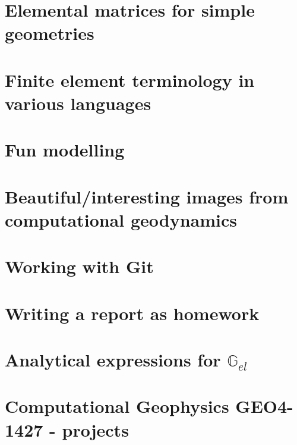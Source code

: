 \documentclass[a4paper]{article}
\numberwithin{equation}{section}
\newcommand{\G}{{\mathbb{G}}}
\begin{document}
\section{Elemental matrices for simple geometries}\label{app:mm} 
\newpage %
\section{Finite element terminology in various languages}  %
\newpage %
\section{Fun modelling}  %
\newpage %
\section{Beautiful/interesting images from computational geodynamics}%
\newpage %
\section{Working with Git} %
\newpage %
\section{Writing a report as homework \label{app:grading}} %
\newpage %
\section{Analytical expressions for $\G_{el}$} \label{app:Gel} %
\newpage %
\section{Computational Geophysics GEO4-1427 - projects}  %
\newpage %
\end{document}
